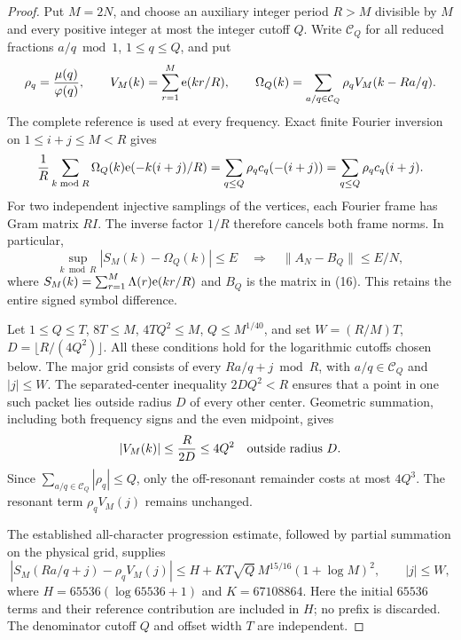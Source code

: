 \begin{proof}
Put \(M=2N\), and choose an auxiliary integer period \(R>M\)
divisible by \(M\) and every positive integer at most the integer
cutoff \(Q\). Write \(\mathcal C_Q\) for all reduced fractions
\(a/q\bmod1\), \(1\leq q\leq Q\), and put
\[
 \rho_q=\frac{\mu(q)}{\varphi(q)},\qquad
 V_M(k)=\sum_{r=1}^M\mathrm e(kr/R),\qquad
 \Omega_Q(k)=\sum_{a/q\in\mathcal C_Q}
               \rho_q V_M(k-Ra/q).
\]
The complete reference is used at every frequency.
Exact finite Fourier inversion on \(1\leq i+j\leq M<R\) gives
\[
 \frac1R\sum_{k\bmod R}\Omega_Q(k)\mathrm e(-k(i+j)/R)
       =\sum_{q\leq Q}\rho_q c_q(-(i+j))
       =\sum_{q\leq Q}\rho_q c_q(i+j).
\]
For two independent injective samplings of the vertices, each
Fourier frame has Gram matrix \(R I\). The inverse factor \(1/R\)
therefore cancels both frame norms. In particular,
\[
 \sup_{k\bmod R}|S_M(k)-\Omega_Q(k)|\leq E
 \quad\Longrightarrow\quad
 \|A_N-B_Q\|\leq E/N,                                      \tag{17}
\]
where \(S_M(k)=\sum_{r=1}^M\Lambda(r)\mathrm e(kr/R)\)
and \(B_Q\) is the matrix in (16).
This retains the entire signed symbol difference.

Let \(1\leq Q\leq T\), \(8T\leq M\),
\(4TQ^2\leq M\), \(Q\leq M^{1/40}\), and set
\(W=(R/M)T\), \(D=\lfloor R/(4Q^2)\rfloor\).
All these conditions hold for the logarithmic cutoffs chosen below.
The major grid consists of every \(Ra/q+j\bmod R\), with
\(a/q\in\mathcal C_Q\) and \(|j|\leq W\).
The separated-center inequality \(2DQ^2<R\) ensures that a
point in one such packet lies outside radius \(D\) of every
other center. Geometric summation, including both frequency
signs and the even midpoint, gives
\[
 |V_M(k)|\leq\frac{R}{2D}\leq4Q^2
 \quad\hbox{outside radius }D.
\]
Since \(\sum_{a/q\in\mathcal C_Q}|\rho_q|\leq Q\), only the
off-resonant remainder costs at most \(4Q^3\).
The resonant term \(\rho_q V_M(j)\) remains unchanged.

The established all-character progression estimate, followed
by partial summation on the physical grid, supplies
\[
 |S_M(Ra/q+j)-\rho_q V_M(j)|
 \leq H+K T\sqrt Q\,M^{15/16}(1+\log M)^2,
 \qquad |j|\leq W,                                        \tag{18}
\]
where \(H=65536(\log65536+1)\) and \(K=67108864\).
Here the initial \(65536\) terms and their reference contribution
are included in \(H\); no prefix is discarded.
The denominator cutoff \(Q\) and offset width \(T\) are independent.


\end{proof}
